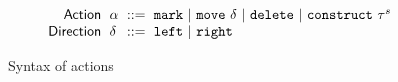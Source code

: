 \begin{figure}
  \vspace{-3px}
  \[
  \arraycolsep=3pt\begin{array}{rlrl}
      \mathsf{Action} & \action & ::= &
        \actionlit{mark} ~\vert~
        \actionlit{move}~\direction ~\vert~
        \actionlit{delete} ~\vert~
        \actionlit{construct}~\tile^s \\
      \mathsf{Direction} & \direction & ::= &
        \texttt{left} ~\vert~
        \texttt{right}
  \end{array}\]
  \caption{Syntax of actions}
  \label{fig:action-syntax}
\end{figure}
